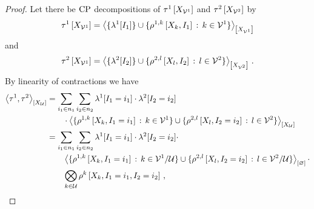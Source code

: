 \begin{proof}
    Let there be $\mathrm{CP}$ decompositions of $\tau^{1}\left[X_{\mathcal{V}^{1}}\right]$ and $\tau^{2}\left[X_{\mathcal{V}^{2}}\right]$ by
    \begin{align*}
        \tau^{1}\left[X_{\mathcal{V}^{1}}\right]
        = \left\langle \{\lambda^{1}[I_{1}]\}\cup\{\rho^{1,k}\left[X_{k},I_{1}\right] \,:\, k\in\mathcal{V}^{1}\}\right\rangle_{\left[ X_{\mathcal{V}^{1}} \right]}
    \end{align*}
    and
    \begin{align*}
        \tau^{2}\left[X_{\mathcal{V}^{1}}\right]
        = \left\langle \{\lambda^{2}[I_{2}]\}\cup\{\rho^{2,l}\left[X_{l},I_{2}\right] \,:\, l\in\mathcal{V}^{2}\}\right\rangle_{\left[ X_{\mathcal{V}^{2}} \right]} \, .
    \end{align*}
    By linearity of contractions we have
    \begin{align*}
        \left\langle \tau^{1},\tau^{2}\right\rangle_{\left[ X_{\mathcal{U}} \right]}
        &= \sum_{i_{1}\in n_{1}} \sum_{i_{2}\in n_{2}}
        \lambda^{1}[I_{1}=i_{1}] \cdot \lambda^{2}[I_{2}=i_{2}] \\
        & \quad\quad \cdot \left\langle \{\rho^{1,k}\left[X_{k},I_{1}=i_{1}\right] \,:\, k\in\mathcal{V}^{1}\} \cup \{\rho^{2,l}\left[X_{l},I_{2}=i_{2}\right] \,:\, l\in\mathcal{V}^{2}\}\right\rangle_{\left[ X_{\mathcal{U}} \right]} \\
        &= \sum_{i_{1}\in n_{1}} \sum_{i_{2}\in n_{2}}
        \lambda^{1}[I_{1}=i_{1}] \cdot \lambda^{2}[I_{2}=i_{2}] \cdot \\
        & \quad\quad \left\langle \{\rho^{1,k}\left[X_{k},I_{1}=i_{1}\right] \,:\, k\in\mathcal{V}^{1}/\mathcal{U}\} \cup \{\rho^{2,l}\left[X_{l},I_{2}=i_{2}\right] \,:\, l\in\mathcal{V}^{2}/\mathcal{U}\}\right\rangle_{\left[ \varnothing \right]} \cdot \\
        & \quad\quad \bigotimes_{k\in\mathcal{U}} \rho^{k}\left[X_{k},I_{1}=i_{1},I_{2}=i_{2}\right] \, ,
    \end{align*}

\end{proof}
